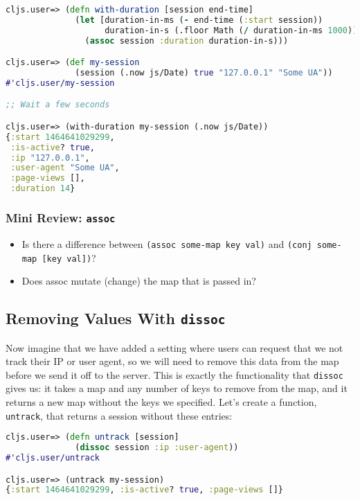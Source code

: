 \documentclass[10pt,twoside,openright]{memoir}
\begin{document}
\begin{lstlisting}[language=Clojure]
cljs.user=> (defn with-duration [session end-time]
              (let [duration-in-ms (- end-time (:start session))
                    duration-in-s (.floor Math (/ duration-in-ms 1000))]
                (assoc session :duration duration-in-s)))

cljs.user=> (def my-session
              (session (.now js/Date) true "127.0.0.1" "Some UA"))
#'cljs.user/my-session

;; Wait a few seconds

cljs.user=> (with-duration my-session (.now js/Date))
{:start 1464641029299,
 :is-active? true,
 :ip "127.0.0.1",
 :user-agent "Some UA",
 :page-views [],
 :duration 14}
\end{lstlisting}

\subsubsection{Mini Review: \texttt{assoc}}

\begin{itemize}
\tightlist
\item
  Is there a difference between \texttt{(assoc\ some-map\ key\ val)} and
  \texttt{(conj\ some-map\ {[}key\ val{]})}?
\item
  Does assoc mutate (change) the map that is passed in?
\end{itemize}


\subsection{Removing Values With \texttt{dissoc}}

Now imagine that we have added a setting where users can request that we
not track their IP or user agent, so we will need to remove this data
from the map before we send it off to the server. This is exactly the
functionality that \texttt{dissoc} gives us: it takes a map and any
number of keys to remove from the map, and it returns a new map without
the keys we specified. Let's create a function, \texttt{untrack}, that
returns a session without these entries:

\begin{lstlisting}[language=Clojure]
cljs.user=> (defn untrack [session]
              (dissoc session :ip :user-agent))
#'cljs.user/untrack

cljs.user=> (untrack my-session)
{:start 1464641029299, :is-active? true, :page-views []}
\end{lstlisting}
\end{document}
